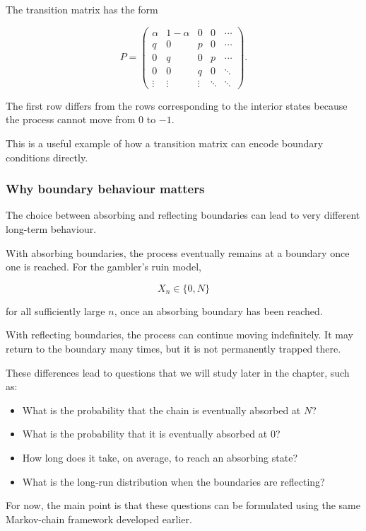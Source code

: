 \documentclass[
  letterpaper,
  DIV=11,
  numbers=noendperiod]{scrartcl}
\providecommand{\tightlist}{%
  \setlength{\itemsep}{0pt}\setlength{\parskip}{0pt}}
\theoremstyle{definition}
\theoremstyle{remark}
\begin{document}
The transition matrix has the form

\[
P=
\begin{pmatrix}
\alpha & 1-\alpha & 0 & 0 & \cdots\\
q & 0 & p & 0 & \cdots\\
0 & q & 0 & p & \cdots\\
0 & 0 & q & 0 & \ddots\\
\vdots & \vdots & \vdots & \ddots & \ddots
\end{pmatrix}.
\]

The first row differs from the rows corresponding to the interior states
because the process cannot move from \(0\) to \(-1\).

This is a useful example of how a transition matrix can encode boundary
conditions directly.

\subsubsection{Why boundary behaviour
matters}\label{why-boundary-behaviour-matters}

The choice between absorbing and reflecting boundaries can lead to very
different long-term behaviour.

With absorbing boundaries, the process eventually remains at a boundary
once one is reached. For the gambler's ruin model,

\[
X_n\in\{0,N\}
\]

for all sufficiently large \(n\), once an absorbing boundary has been
reached.

With reflecting boundaries, the process can continue moving
indefinitely. It may return to the boundary many times, but it is not
permanently trapped there.

These differences lead to questions that we will study later in the
chapter, such as:

\begin{itemize}
\tightlist
\item
  What is the probability that the chain is eventually absorbed at
  \(N\)?
\item
  What is the probability that it is eventually absorbed at \(0\)?
\item
  How long does it take, on average, to reach an absorbing state?
\item
  What is the long-run distribution when the boundaries are reflecting?
\end{itemize}

For now, the main point is that these questions can be formulated using
the same Markov-chain framework developed earlier.
\end{document}
